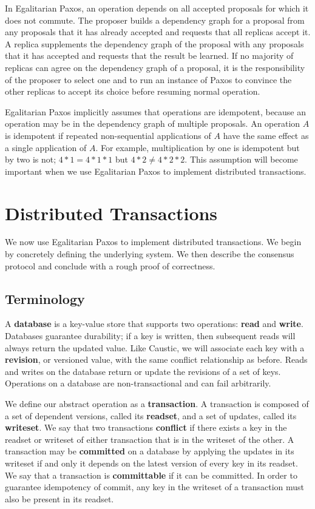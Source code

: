 \documentclass[../main.tex]{subfiles}
\begin{document}
  In Egalitarian Paxos, an operation depends on all accepted proposals for which it does not
  commute. The proposer builds a dependency graph for a proposal from any proposals that it has
  already accepted and requests that all replicas accept it. A replica supplements the dependency
  graph of the proposal with any proposals that it has accepted and requests that the result be
  learned. If no majority of replicas can agree on the dependency graph of a proposal, it is the
  responsibility of the proposer to select one and to run an instance of Paxos to convince the
  other replicas to accept its choice before resuming normal operation.

  Egalitarian Paxos implicitly assumes that operations are idempotent, because an operation may be
  in the dependency graph of multiple proposals. An operation $A$ is idempotent if repeated
  non-sequential applications of $A$ have the same effect as a single application of $A$. For
  example, multiplication by one is idempotent but by two is not; $4 * 1 = 4 * 1 * 1$ but
  $4 * 2 \ne 4 * 2 * 2$. This assumption will become important when we use Egalitarian Paxos to
  implement distributed transactions.

\section{Distributed Transactions}
We now use Egalitarian Paxos to implement distributed transactions. We begin by concretely
defining the underlying system. We then describe the consensus protocol and conclude with a rough
proof of correctness.

  \subsection{Terminology}
  A \textbf{database} is a key-value store that supports two operations: \textbf{read} and
  \textbf{write}. Databases guarantee durability; if a key is written, then subsequent
  reads will always return the updated value. Like Caustic, we will associate each key with a
  \textbf{revision}, or versioned value, with the same conflict relationship as before. Reads and
  writes on the database return or update the revisions of a set of keys. Operations on a database
  are non-transactional and can fail arbitrarily.

  We define our abstract operation as a \textbf{transaction}. A transaction is composed of a set
  of dependent versions, called its \textbf{readset}, and a set of updates, called its
  \textbf{writeset}. We say that two transactions \textbf{conflict} if there exists a key in the
  readset or writeset of either transaction that is in the writeset of the other. A transaction may
  be \textbf{committed} on a database by applying the updates in its writeset if and only it
  depends on the latest version of every key in its readset. We say that a transaction is
  \textbf{committable} if it can be committed. In order to guarantee idempotency of commit, any key
  in the writeset of a transaction must also be present in its readset.
\end{document}
